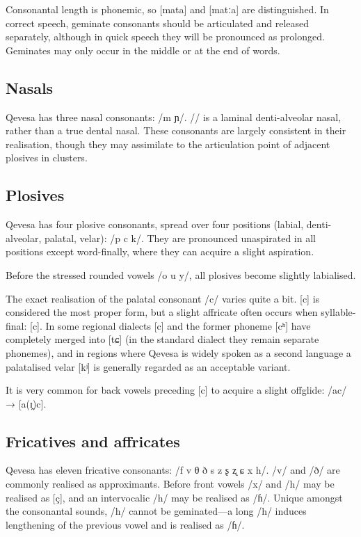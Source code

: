 \documentclass[grammar]{subfiles}
\begin{document}
Consonantal length is phonemic, so [mata] and [matːa] are distinguished.  In
correct speech, geminate consonants should be articulated and released
separately, although in quick speech they will be pronounced as prolonged.
Geminates may only occur in the middle or at the end of words.


\subsection{Nasals}
\label{ssec:nasals}

Qevesa has three nasal consonants: /m  ɲ/.  // is a laminal
denti-alveolar nasal, rather than a true dental nasal.  These consonants are
largely consistent in their realisation, though they may assimilate to the
articulation point of adjacent plosives in clusters. 


\subsection{Plosives}
\label{ssec:plosives}

Qevesa has four plosive consonants, spread over four positions (labial,
denti-alveolar, palatal, velar): /p  c k/.  They are pronounced
unaspirated in all positions except word-finally, where they can acquire
a slight aspiration.

Before the stressed rounded vowels /o u y/, all plosives become slightly
labialised.

The exact realisation of the palatal consonant /c/ varies quite a bit.  [c] is
considered the most proper form, but a slight affricate often occurs when
syllable-final: [c].  In some regional dialects [c] and the former
phoneme [cʰ] have completely merged into [tɕ] (in the standard dialect they
remain separate phonemes), and in regions where Qevesa is widely spoken as a
second language a palatalised velar [kʲ] is generally regarded as an acceptable
variant. 

It is very common for back vowels preceding [c] to acquire a slight offglide:
/ac/ → [a(ɪ̯)c].


\subsection{Fricatives and affricates}
\label{ssec:fricatives}

Qevesa has eleven fricative consonants: /f v θ ð s z ʂ ʐ ɕ x h/.  /v/ and /ð/
are commonly realised as approximants.  Before front vowels /x/ and /h/ may be
realised as [ç], and an intervocalic /h/ may be realised as /ɦ/. Unique amongst
the consonantal sounds, /h/ cannot be geminated—a long /h/ induces lengthening
of the previous vowel and is realised as /ɦ/.
\end{document}
